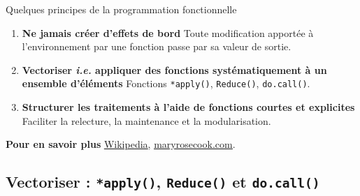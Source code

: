 \documentclass[12pt,ignorenonframetext,]{beamer}
\providecommand{\tightlist}{%
  \setlength{\itemsep}{0pt}\setlength{\parskip}{0pt}}
\newcommand{\intertitre}[1]{\textcolor{redInsee}{\textbf{#1}}}
\begin{document}
\begin{frame}[fragile]{Quelques principes de la programmation
fonctionnelle}
\protect\hypertarget{quelques-principes-de-la-programmation-fonctionnelle}{}

\vfill

\begin{enumerate}
[1.]
\tightlist
\item
  \textbf{Ne jamais créer d’effets de bord} Toute modification apportée
  à l’environnement par une fonction passe par sa valeur de sortie.
\end{enumerate}

\vfill

\begin{enumerate}
[1.]
\setcounter{enumi}{1}
\tightlist
\item
  \pause \textbf{Vectoriser \textit{i.e.} appliquer des fonctions systématiquement à un ensemble d'éléments}
  Fonctions \texttt{*apply()}, \texttt{Reduce()}, \texttt{do.call()}.
\end{enumerate}

\vfill

\begin{enumerate}
[1.]
\setcounter{enumi}{2}
\tightlist
\item
  \pause \textbf{Structurer les traitements à l'aide de fonctions courtes et explicites}
  Faciliter la relecture, la maintenance et la modularisation.
\end{enumerate}

\vfill

\pause \intertitre{Pour en savoir plus}
\href{https://en.wikipedia.org/wiki/FP_(programming_language)}{\underline{Wikipedia}},
\href{https://maryrosecook.com/blog/post/a-practical-introduction-to-functional-programming}{\underline{maryrosecook.com}}.

\vfill

\end{frame}

\hypertarget{vectoriser-apply-reduce-et-do.call}{%
\subsection{\texorpdfstring{Vectoriser : \texttt{*apply()},
\texttt{Reduce()} et
\texttt{do.call()}}{Vectoriser : *apply(), Reduce() et do.call()}}\label{vectoriser-apply-reduce-et-do.call}}
\end{document}
